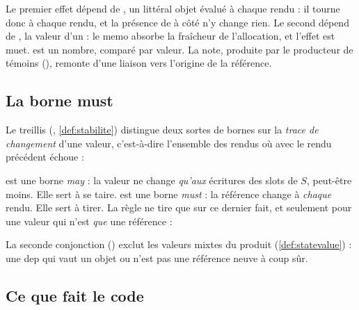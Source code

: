 Le premier effet dépend de , un littéral objet évalué à chaque rendu : il tourne donc à chaque rendu, et la présence de  à côté n'y change rien. Le second dépend de , la valeur d'un  : le memo absorbe la fraîcheur de l'allocation, et l'effet est muet.  est un nombre, comparé par valeur. La note, produite par le producteur de témoins  (), remonte d'une liaison vers l'origine de la référence.

\subsection{La borne must }

Le treillis  (, \cref{def:stabilite}) distingue deux sortes de bornes sur la \emph{trace de changement} d'une valeur, c'est-à-dire l'ensemble des rendus où  avec le rendu précédent échoue :


 est une borne \emph{may} : la valeur ne change \emph{qu'aux} écritures des slots de $S$, peut-être moins. Elle sert à se taire.  est une borne \emph{must} : la référence change à \emph{chaque} rendu. Elle sert à tirer. La règle ne tire que sur ce dernier fait, et seulement pour une valeur qui n'est \emph{que} une référence :


La seconde conjonction () exclut les valeurs mixtes du produit  (\cref{def:statevalue}) : une dep qui vaut \og un objet ou \fg{} n'est pas une référence neuve à coup sûr.

\subsection{Ce que fait le code}


